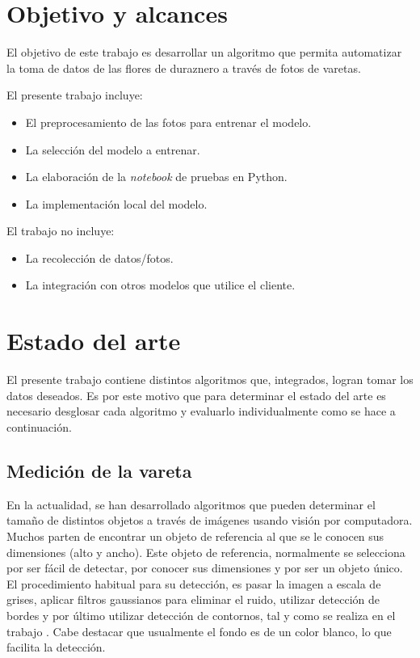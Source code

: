 \section{Objetivo y alcances}

El objetivo de este trabajo es desarrollar un algoritmo que permita automatizar la toma de datos de las flores de duraznero a través de fotos de varetas.

El presente trabajo incluye:
\begin{itemize}
	\item El preprocesamiento de las fotos para entrenar el modelo.
	\item La selección del modelo a entrenar.
	\item La elaboración de la \textit{notebook} de pruebas en Python.
	\item La implementación local del modelo.
\end{itemize}

El trabajo no incluye:
\begin{itemize}
	\item La recolección de datos/fotos.
	\item La integración con otros modelos que utilice el cliente.
\end{itemize}



\section{Estado del arte}

El presente trabajo contiene distintos algoritmos que, integrados, logran tomar los datos deseados. Es por este motivo que para determinar el estado del arte es necesario desglosar cada algoritmo y evaluarlo individualmente como se hace a continuación.

\subsection{Medición de la vareta}

En la actualidad, se han desarrollado algoritmos que pueden determinar el tamaño de distintos objetos a través de imágenes usando visión por computadora. Muchos parten de encontrar un objeto de referencia al que se le conocen sus dimensiones (alto y ancho). Este objeto de referencia, normalmente se selecciona por ser fácil de detectar, por conocer sus dimensiones y por ser un objeto único. El procedimiento habitual para su detección, es pasar la imagen a escala de grises, aplicar filtros gaussianos para eliminar el ruido, utilizar detección de bordes y por último utilizar detección de contornos, tal y como se realiza en el trabajo \cite{ARTICLE:2}. Cabe destacar que usualmente el fondo es de un color blanco, lo que facilita la detección.

